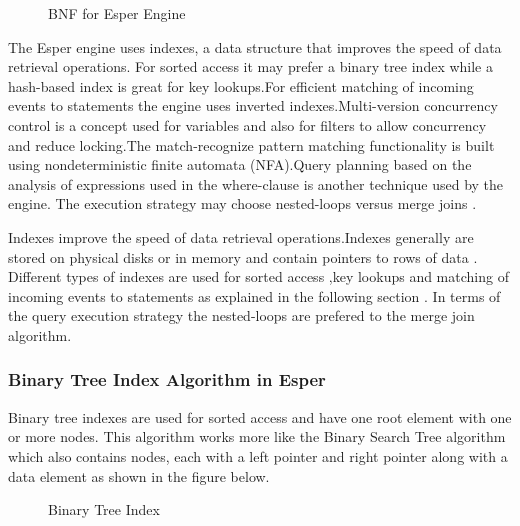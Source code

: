 \begin{center}
\begin{figure}[h]
\caption{BNF for Esper Engine \cite{twentyfive}}

\end{figure}
\end{center}

\noindent The Esper engine \cite{twentyfive} uses indexes, a data structure that improves the speed of data retrieval operations. For sorted access it may prefer a binary tree index while a hash-based index is great for key lookups.For efficient matching of incoming events to statements the engine uses inverted indexes.Multi-version concurrency control is a concept used for variables and also for filters to allow concurrency and reduce locking.The match-recognize pattern matching functionality is built using nondeterministic finite automata (NFA).Query planning based on the analysis of expressions used in the where-clause is another technique used by the engine. The execution strategy may choose nested-loops versus merge joins \cite{twentyfive}.

\noindent Indexes improve the speed of data retrieval operations.Indexes generally are stored on physical disks or in memory and contain pointers to rows of data \cite{twentyfive}. Different types of indexes are used for sorted access ,key lookups  and matching of incoming events to statements as explained in the following section . In terms of the query execution strategy the nested-loops are prefered to the merge join algorithm.

\subsubsection{Binary Tree Index Algorithm in Esper}

\noindent  Binary tree indexes are used for sorted access and have one root element with one or more nodes.  This algorithm works more like the Binary Search Tree algorithm which also contains nodes, each with a left pointer and right pointer along with a data element as shown in the figure below.

\begin{center}
\begin{figure}[h]
\caption{Binary Tree Index\cite{twentyeight}}

\end{figure}
\end{center}

